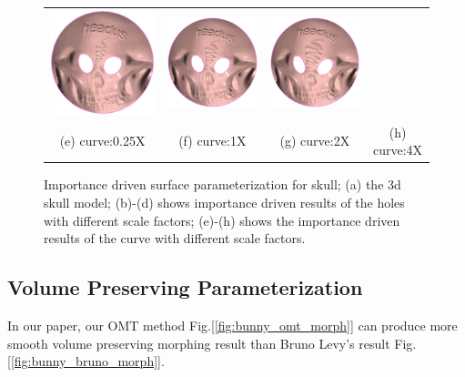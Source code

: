 \documentclass[runningheads]{llncs}
\begin{document}
{\begin{figure}[!htbp]
\begin{tabular}{cccc}
\includegraphics[height=0.25\textwidth]{./figs/roi_skull/skull_f.jpg}&
\includegraphics[height=0.25\textwidth]{./figs/roi_skull/skull_g.jpg}&
\includegraphics[height=0.25\textwidth]{./figs/roi_skull/skull_h.jpg}\\
(e) curve:0.25X &(f) curve:1X&(g) curve:2X &(h) curve:4X \\
\end{tabular}
   \caption{Importance driven surface parameterization for skull; (a) the 3d skull model; (b)-(d) shows importance driven results of the holes with different scale factors; (e)-(h) shows the importance driven results of the curve with different scale factors.}
  \label{fig:roi_skull}
\end{figure}
}


\subsection{Volume Preserving Parameterization}


In our paper\cite{su2016volume}, our OMT method Fig.[\ref{fig:bunny_omt_morph}] can produce more smooth volume preserving morphing result than Bruno Levy's result Fig.[\ref{fig:bunny_bruno_morph}].
\end{document}
